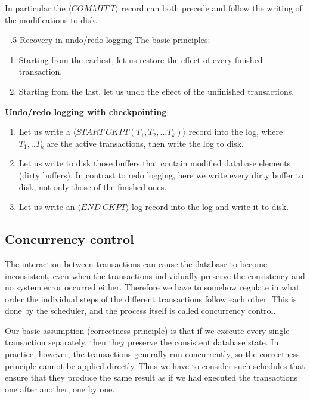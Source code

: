 \documentclass[margin=0px]{article}
\makeatletter
\renewcommand\paragraph{%
	\@startsection{paragraph}{4}{0mm}%
	{-\baselineskip}%
	{.5\baselineskip}%
	{\normalfont\normalsize\bfseries}}
\makeatother
\begin{document}
\noindent In particular the $\langle COMMIT \ T\rangle$ record can both precede and follow the writing of the modifications to disk.

\paragraph{Recovery in undo/redo logging}
\noindent The basic principles:
\begin{enumerate}
    \item	Starting from the earliest, let us restore the effect of every finished transaction.
    \item	Starting from the last, let us undo the effect of the unfinished transactions.
\end{enumerate}


\noindent \textbf{Undo/redo logging with checkpointing}:
\begin{enumerate}
    \item	Let us write a $\langle START \ CKPT(T_{1},T_{2},...T_{k}) \rangle$ record into the log, where $T_{1},..T_{k}$ are the active
          transactions, then write the log to disk.

    \item	Let us write to disk those buffers that contain modified database elements (dirty buffers). In contrast to redo logging,
          here we write every dirty buffer to disk, not only those of the finished ones.

    \item	Let us write an $\langle END \ CKPT \rangle$ log record into the log and write it to disk.
\end{enumerate}

\subsection{Concurrency control}

The interaction between transactions can cause the database to become inconsistent, even when the transactions individually
preserve the consistency and no system error occurred either. Therefore we have to somehow regulate in what order the individual
steps of the different transactions follow each other. This is done by the scheduler, and the process itself is called concurrency control.

Our basic assumption (correctness principle) is that if we execute every single transaction separately, then they preserve the consistent
database state. In practice, however, the transactions generally run concurrently, so the correctness principle cannot be
applied directly. Thus we have to consider such schedules that ensure that they produce the same result
as if we had executed the transactions one after another, one by one.
\end{document}
